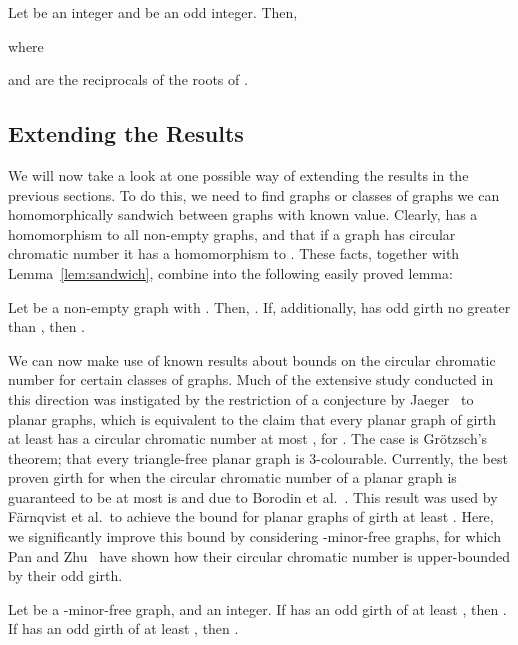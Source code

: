\documentclass[11pt,a4paper]{article}
\begin{document}
\begin{proposition} \label{th:qisfunny}
Let  be an integer and  be an odd integer. Then,

where

and  are the reciprocals of the roots of
.
\end{proposition}






\subsection{Extending the Results} \label{sec:apply}

We will now take a look at one possible way of extending the results in
the previous sections. To do this, we need to find graphs or classes of
graphs we can homomorphically sandwich between graphs with known
 value. Clearly,  has a homomorphism to all non-empty
graphs, and that if a graph  has circular chromatic number  it has a homomorphism to . These facts, together with
Lemma~\ref{lem:sandwich}, combine into the following easily proved
lemma:

\begin{lemma}
\label{lem:circlesandwich}
Let  be a non-empty graph with . Then, .
If, additionally,  has odd girth no greater than , 
then .
\end{lemma}



We can now make use of known results about bounds on the circular
chromatic number for certain classes of graphs. Much of the extensive
study conducted in this direction was instigated by the restriction of a
conjecture by Jaeger~\cite{jaeger:88} to planar graphs, which is
equivalent to the claim that every planar graph of girth at least 
has a circular chromatic number at most , for . The
case  is Gr\"{o}tzsch's theorem; that every triangle-free planar
graph is 3-colourable. Currently, the best proven girth for when the
circular chromatic number of a planar graph is guaranteed to be at most
 is  and due to Borodin et
al.~\cite{Borodin:etal:jctb2004}. This result was used by F\"{a}rnqvist
et al.\ to achieve the bound  for planar
graphs  of girth at least . Here, we significantly improve
this bound by considering -minor-free graphs, for which Pan and
Zhu~\cite{pan:zhu:02} have shown how their circular chromatic number is
upper-bounded by their odd girth.
\begin{proposition} \label{thmI}
Let  be a -minor-free graph, and  an integer. If 
has an odd girth of at least , then . If  has an odd girth of at least , then
.
\end{proposition}
\end{document}
